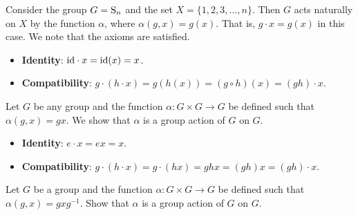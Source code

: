 \begin{example}
    Consider the group $G = \mathrm{S}_{n}$ and the set $X = \{1, 2, 3, \dots, n\}$. Then $G$ acts naturally on $X$ by the function $\alpha$, where $\alpha(g, x) = g(x)$. That is, $g \cdot x = g(x)$ in this case. We note that the axioms are satisfied.
    \begin{itemize}
        \item \textbf{Identity}: $\mathrm{id} \cdot x = \mathrm{id}(x) = x$.
        \item \textbf{Compatibility}: $g \cdot (h \cdot x) = g(h(x)) = (g \circ h)(x) = (gh) \cdot x$.
    \end{itemize}
\end{example}

\begin{example}
    Let $G$ be any group and the function $\alpha: G\times G \to G$ be defined such that $\alpha(g, x) = gx$. We show that $\alpha$ is a group action of $G$ on $G$.
    \begin{itemize}
        \item \textbf{Identity}: $e\cdot x = ex = x$.
        \item \textbf{Compatibility}: $g \cdot (h\cdot x) = g \cdot (hx) = ghx = (gh)x = (gh) \cdot x$.
    \end{itemize}
\end{example}

\begin{exercise}\label{exercise-conjugacy-is-group-action}
    Let $G$ be a group and the function $\alpha: G\times G \to G$ be defined such that $\alpha(g, x) = gxg^{-1}$. Show that $\alpha$ is a group action of $G$ on $G$.
\end{exercise}

